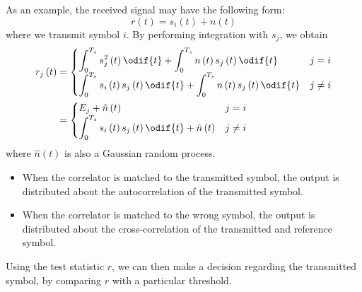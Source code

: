 \documentclass{article}
\begin{document}
As an example, the received signal may have the following form:
\begin{equation*}
    r\left( t \right) = s_i\left( t \right) + n\left( t \right)
\end{equation*}
where we transmit symbol \(i\).
By performing integration with \(s_j\), we obtain
\begin{align*}
    r_j\left( t \right) & =
    \begin{cases}
        \displaystyle\int_0^{T_s} s_j^2\left( t \right) \odif{t} + \int_0^{T_s} n\left( t \right) s_j\left( t \right) \odif{t}                   & j = i    \\
        \displaystyle\int_0^{T_s} s_i\left( t \right) s_j\left( t \right) \odif{t} + \int_0^{T_s} n\left( t \right) s_j\left( t \right) \odif{t} & j \neq i
    \end{cases}
    \\
                        & =
                            \begin{cases}
                                E_j + \hat{n}\left( t \right)                                                                        & j = i    \\
                                \displaystyle\int_0^{T_s} s_i\left( t \right) s_j\left( t \right) \odif{t} + \hat{n}\left( t \right) & j \neq i
                            \end{cases}
\end{align*}
where \(\hat{n}\left( t \right)\) is also a Gaussian random process.
\begin{itemize}
    \item When the correlator is matched to the
          transmitted symbol, the output is distributed about the
          autocorrelation of the transmitted symbol.
    \item When the correlator is matched to the wrong symbol, the
          output is distributed about the cross-correlation
          of the transmitted and reference symbol.
\end{itemize}
Using the test statistic \(r\), we can then make a decision regarding
the transmitted symbol, by comparing \(r\) with a particular threshold.
\end{document}
